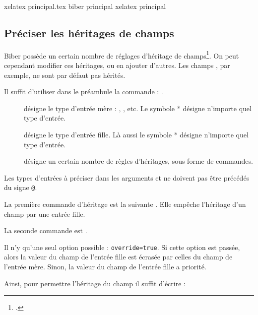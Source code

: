 \begin{bashcode}
xelatex principal.tex
biber principal
xelatex principal
\end{bashcode}

\subsection{Préciser les héritages de champs}

Biber possède un certain nombre de réglages d'héritage de champs\footcite{biblatex_crossrefsetup}. On peut cependant modifier ces héritages, ou en ajouter d'autres. Les champs , par exemple, ne sont par défaut pas hérités. 

Il suffit d'utiliser dans le préambule la commande :
.

\begin{description}
\item[] désigne le type d'entrée mère : , , etc. Le symbole * désigne n'importe quel type d'entrée.
\item[] désigne le type d'entrée fille. Là aussi le symbole * désigne n'importe quel type d'entrée.
\item[] désigne un certain nombre de règles d'héritages, sous forme de commandes.
\end{description}

Les types d'entrées à préciser dans les arguments  et  ne doivent pas être précédés du signe \verb|@|.

La première commande d'héritage est la suivante .
Elle empêche l'héritage d'un champ par une entrée fille.

La seconde commande est 
.

Il n'y qu'une seul option possible : \verb|override=true|. Si cette option est passée, alors la valeur du champ de l'entrée fille est écrasée par celles du champ de l'entrée mère. Sinon, la valeur  du champ de l'entrée fille a priorité.

Ainsi, pour permettre l'héritage du  champ  il suffit d'écrire :

\begin{latexcode}
\end{latexcode}

